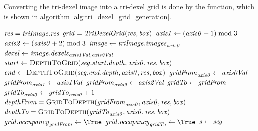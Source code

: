 Converting the tri-dexel image into a tri-dexel grid is done by the  function, which is shown in algorithm \ref{alg:tri_dexel_grid_generation}.
%
\begin{algorithm}
	\centering
	\begin{algorithmic}[1]
			\State $\mathit{res} = \mathit{triImage}.\mathit{res}$
			\State $\mathit{grid} = \mathit{TriDexelGrid}(\mathit{res}, \mathit{box})$ 
				\State $\mathit{axis1} \gets (\mathit{axis0} + 1) \bmod 3$
				\State $\mathit{axis2} \gets (\mathit{axis0} + 2) \bmod 3$
				\State $\mathit{image} \gets \mathit{triImage}.\mathit{images}_{\mathit{axis0}}$
						\State $\mathit{dexel} \gets \mathit{image}.\mathit{dexels}_{\mathit{axis1Val}, \mathit{axis2Val}}$
							\State $\var{start} \gets \Call{DepthToGrid}{\var{seg}.\var{start}.\var{depth}, \var{axis0}, \var{res}, \var{box}}$
							\State $\var{end} \gets \Call{DepthToGrid}{\var{seg}.\var{end}.\var{depth}, \var{axis0}, \var{res}, \var{box}}$
								\State $\mathit{gridFrom}_{\mathit{axis0}} \gets \mathit{axis0Val}$
								\State $\mathit{gridFrom}_{\mathit{axis1}} \gets \mathit{axis1Val}$
								\State $\mathit{gridFrom}_{\mathit{axis2}} \gets \mathit{axis2Val}$
								\State $\mathit{gridTo} \gets \mathit{gridFrom}$
								\State $\mathit{gridTo}_{\mathit{axis0}} \gets \mathit{gridTo}_{\mathit{axis0}} + 1$
								\State $\var{depthFrom} = \Call{GridToDepth}{\var{gridFrom}_{\var{axis0}}, \var{axis0}, \var{res}, \var{box}}$
								\State $\var{depthTo}   = \Call{GridToDepth}{\var{gridTo}_{\var{axis0}}, \var{axis0}, \var{res}, \var{box}}$
									\State $\var{grid}.\var{occupancy}_{\var{gridFrom}} \gets \True$
								\EndIf
									\State $\var{grid}.\var{occupancy}_{\var{gridTo}} \gets \True$
								\EndIf
								\State $\mathit{s} \gets \mathit{seg}$

\end{algorithmic}
\end{algorithm}
